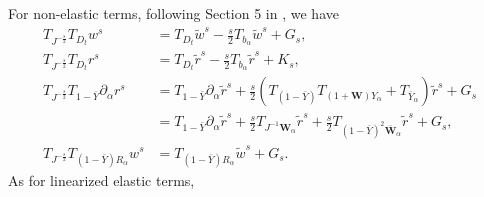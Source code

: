 \documentclass[10pt]{amsart}
\theoremstyle{remark}
\theoremstyle{definition}
\numberwithin{equation}{section}
\newcommand{\p}{\partial}
\newcommand{\al}{\alpha}
\newcommand{\f}{\frac}
\newcommand{\bw}{\mathbf{W}}
\begin{document}
For non-elastic terms, following Section 5 in \cite{AIT}, we have
\begin{align*}
T_{J^{-\f{s}{2}}}T_{D_t}w^s &=T_{D_t}\tilde{w}^s-\f{s}{2} T_{b_{\al}}\tilde{w}^s+G_s,\\
T_{J^{-\f{s}{2}}}T_{D_t}r^s&=T_{D_t}\tilde{r}^s-\f{s}{2} T_{b_{\al}}\tilde{r}^s+K_s,\\
T_{J^{-\f{s}{2}}}T_{1-\bar{Y}}\p_{\al}r^s&=T_{1-\bar{Y}}\p_{\al}\tilde{r}^s+\f{s}{2}(T_{(1-\bar{Y})}T_{(1+\bw)Y_{\al}}+T_{\bar{Y}_{\al}})\tilde{r}^s+G_s\\
&= T_{1-\bar{Y}}\p_{\al}\tilde{r}^s+  \f{s}{2} T_{J^{-1}\bw_{\al}} \tilde{r}^s+\f{s}{2} T_{(1-\bar{Y})^2\bar{\bw}_{\al}}\tilde{r}^s +G_s ,\\
T_{J^{-\f{s}{2}}}T_{(1-\bar{Y})R_{\al}}w^s&=T_{(1-\bar{Y})R_{\al}}\tilde{w}^s+G_s.
\end{align*}
As for linearized elastic terms,
\end{document}

